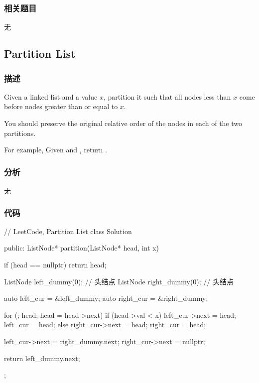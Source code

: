 \subsubsection{相关题目}

\begindot
\item 无
\myenddot


\subsection{Partition List}
\label{sec:partition-list}


\subsubsection{描述}
Given a linked list and a value $x$, partition it such that all nodes less than $x$ come before nodes greater than or equal to $x$.

You should preserve the original relative order of the nodes in each of the two partitions.

For example,
Given  and , return .


\subsubsection{分析}
无


\subsubsection{代码}
\begin{Code}
// LeetCode, Partition List
class Solution {
public:
    ListNode* partition(ListNode* head, int x) {
        if (head == nullptr) return head;

        ListNode left_dummy(0); // 头结点
        ListNode right_dummy(0); // 头结点

        auto left_cur = &left_dummy;
        auto right_cur = &right_dummy;

        for (; head; head = head->next) {
            if (head->val < x) {
                left_cur->next = head;
                left_cur = head;
            } else {
                right_cur->next = head;
                right_cur = head;
            }
        }

        left_cur->next = right_dummy.next;
        right_cur->next = nullptr;

        return left_dummy.next;
    }
};
\end{Code}


